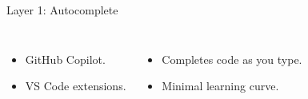 \documentclass[aspectratio=169]{beamer}
\begin{document}
\begin{frame}
    \begin{block}{Layer 1: Autocomplete}
        \vspace{-0.3cm}
        \begin{columns}
            \begin{itemize}
                \item GitHub Copilot.
                \item VS Code extensions.
            \end{itemize}
            \begin{itemize}
                \item Completes code as you type.
                \item Minimal learning curve.
            \end{itemize}
        \end{columns}
    \end{block}
\end{frame}
\end{document}
